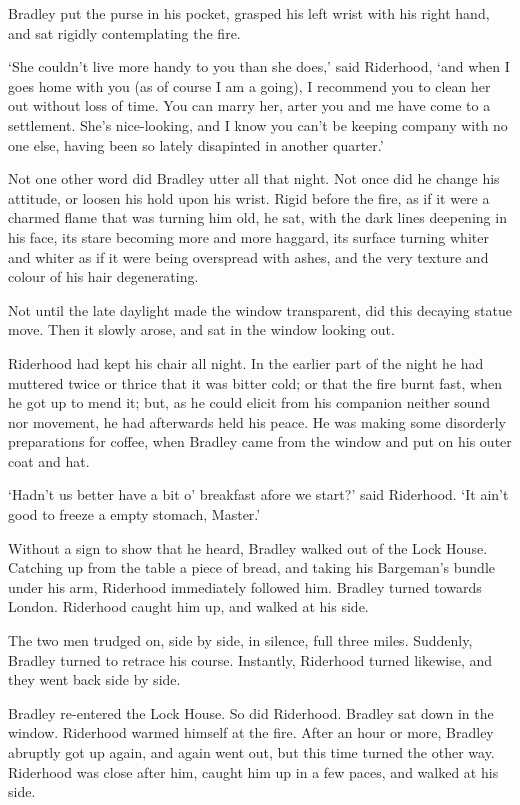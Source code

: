 Bradley put the purse in his pocket, grasped his left wrist with his
right hand, and sat rigidly contemplating the fire.

‘She couldn’t live more handy to you than she does,’ said Riderhood,
‘and when I goes home with you (as of course I am a going), I recommend
you to clean her out without loss of time. You can marry her, arter you
and me have come to a settlement. She’s nice-looking, and I know
you can’t be keeping company with no one else, having been so lately
disapinted in another quarter.’

Not one other word did Bradley utter all that night. Not once did he
change his attitude, or loosen his hold upon his wrist. Rigid before the
fire, as if it were a charmed flame that was turning him old, he sat,
with the dark lines deepening in his face, its stare becoming more and
more haggard, its surface turning whiter and whiter as if it were being
overspread with ashes, and the very texture and colour of his hair
degenerating.

Not until the late daylight made the window transparent, did this
decaying statue move. Then it slowly arose, and sat in the window
looking out.

Riderhood had kept his chair all night. In the earlier part of the night
he had muttered twice or thrice that it was bitter cold; or that the
fire burnt fast, when he got up to mend it; but, as he could elicit from
his companion neither sound nor movement, he had afterwards held his
peace. He was making some disorderly preparations for coffee, when
Bradley came from the window and put on his outer coat and hat.

‘Hadn’t us better have a bit o’ breakfast afore we start?’ said
Riderhood. ‘It ain’t good to freeze a empty stomach, Master.’

Without a sign to show that he heard, Bradley walked out of the Lock
House. Catching up from the table a piece of bread, and taking his
Bargeman’s bundle under his arm, Riderhood immediately followed him.
Bradley turned towards London. Riderhood caught him up, and walked at
his side.

The two men trudged on, side by side, in silence, full three miles.
Suddenly, Bradley turned to retrace his course. Instantly, Riderhood
turned likewise, and they went back side by side.

Bradley re-entered the Lock House. So did Riderhood. Bradley sat down in
the window. Riderhood warmed himself at the fire. After an hour or more,
Bradley abruptly got up again, and again went out, but this time turned
the other way. Riderhood was close after him, caught him up in a few
paces, and walked at his side.

